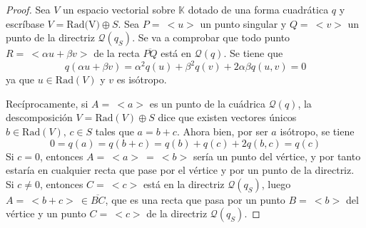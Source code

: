 \documentclass[12pt]{report}
\theoremstyle{definition}
\theoremstyle{definition}
\theoremstyle{remark}
\begin{document}
\begin{proof}
Sea $V$ un espacio vectorial sobre $\mathbb{K}$ dotado de una forma cuadrática $q$ y escríbase $V = \textrm{Rad(V)} \oplus S$. Sea $P = \ <u>$ un punto singular y $Q = \ <v>$ un punto de la directriz $\mathcal{Q}(q_S)$. Se va a comprobar que todo punto $R = \ <\alpha u + \beta v>$ de la recta $\overline{PQ}$ está en $\mathcal{Q}(q)$. Se tiene que
\[q(\alpha u + \beta v) = \alpha^2 q(u)+\beta^2 q(v) + 2\alpha \beta q(u,v) = 0\]
ya que $u \in \textrm{Rad}(V)$ y $v$ es isótropo. 

\vspace{2mm}
Recíprocamente, si $A = \ <a >$ es un punto de la cuádrica $\mathcal{Q}(q)$, la descomposición $V = \textrm{Rad}(V) \oplus S$ dice que existen vectores únicos $b \in \textrm{Rad}(V), \, c \in S$ tales que $a = b + c$. Ahora bien, por ser $a$ isótropo, se tiene
\[0 = q(a) = q(b+c) = q(b) + q(c) + 2q(b,c) = q(c)\]
Si $c = 0$, entonces $A = \ < a > \ = \ < b >$ sería un punto del vértice, y por tanto estaría en cualquier recta que pase por el vértice y por un punto de la directriz. Si $c \neq 0$, entonces $C = \ < c >$ está en la directriz $\mathcal{Q}(q_S)$, luego $A = \ <b+c> \ \in \overline{BC}$, que es una recta que pasa por un punto $B = \ <b>$ del vértice y un punto $C = \ < c >$ de la directriz $\mathcal{Q}(q_S)$.
\end{proof}
\end{document}
